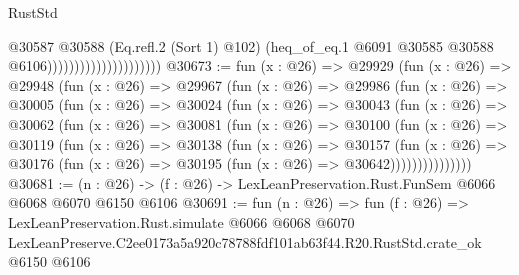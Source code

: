 \begin{lexlean}{RustStd}
\begin{coremodule}
                                          @30587
                                            @30588
                                            (Eq.refl.{2} (Sort 1) @102)
                                            (heq_of_eq.{1}
                                              @6091
                                              @30585
                                              @30588
                                              @6106)))))))))))))))))))))
@30673 := fun (x : @26) =>
  @29929
    (fun (x : @26) =>
    @29948
      (fun (x : @26) =>
      @29967
        (fun (x : @26) =>
        @29986
          (fun (x : @26) =>
          @30005
            (fun (x : @26) =>
            @30024
              (fun (x : @26) =>
              @30043
                (fun (x : @26) =>
                @30062
                  (fun (x : @26) =>
                  @30081
                    (fun (x : @26) =>
                    @30100
                      (fun (x : @26) =>
                      @30119
                        (fun (x : @26) =>
                        @30138
                          (fun (x : @26) =>
                          @30157
                            (fun (x : @26) =>
                            @30176 (fun (x : @26) => @30195 (fun (x : @26) => @30642)))))))))))))))
@30681 := (n : @26) -> (f : @26) -> LexLeanPreservation.Rust.FunSem @6066 @6068 @6070 @6150 @6106
@30691 := fun (n : @26) =>
  fun (f : @26) =>
  LexLeanPreservation.Rust.simulate
    @6066
    @6068
    @6070
    LexLeanPreserve.C2ee0173a5a920c78788fdf101ab63f44.R20.RustStd.crate_ok
    @6150
    @6106
\end{coremodule}
\end{lexlean}
